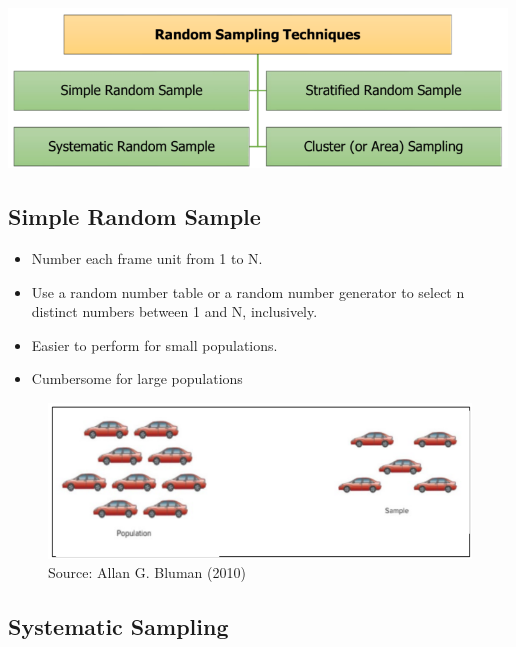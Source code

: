 \documentclass[
  a4paper,
  DIV=11,
  numbers=noendperiod,
  oneside]{scrreprt}
\providecommand{\tightlist}{%
  \setlength{\itemsep}{0pt}\setlength{\parskip}{0pt}}\usepackage{longtable,booktabs,array}
\begin{document}
\includegraphics[width=5.20833in,height=\textheight]{images/ch1/Picture12.png}

\hypertarget{simple-random-sample}{%
\subsection{Simple Random Sample}\label{simple-random-sample}}

\begin{itemize}
\tightlist
\item
  Number each frame unit from 1 to N.
\item
  Use a random number table or a random number generator to select n
  distinct numbers between 1 and N, inclusively.
\item
  Easier to perform for small populations.
\item
  Cumbersome for large populations
\end{itemize}

\begin{figure}

{\centering \includegraphics[width=5.20833in,height=\textheight]{images/ch1/Picture13.png}

}

\caption{Source: Allan G. Bluman (2010)}

\end{figure}

\hypertarget{systematic-sampling}{%
\subsection{Systematic Sampling}\label{systematic-sampling}}
\end{document}
